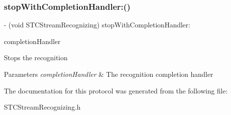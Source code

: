 \subsubsection{\texorpdfstring{stop\+With\+Completion\+Handler\+:()}{stopWithCompletionHandler:()}}
{\footnotesize\ttfamily -\/ (void S\+T\+C\+Stream\+Recognizing) stop\+With\+Completion\+Handler\+: \begin{DoxyParamCaption}\item[{(Recognizing\+Completion\+Handler)}]{completion\+Handler }\end{DoxyParamCaption}}

Stops the recognition 
\begin{DoxyParams}{Parameters}
{\em completion\+Handler} & The recognition completion handler \\
\hline
\end{DoxyParams}


The documentation for this protocol was generated from the following file\+:\begin{DoxyCompactItemize}
\item 
S\+T\+C\+Stream\+Recognizing.\+h\end{DoxyCompactItemize}
